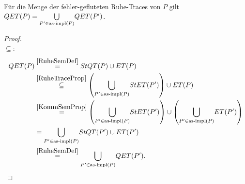 \begin{Prop}
  \label{RuheSemProp}
  Für die Menge der fehler-gefluteten Ruhe-Traces von $P$ gilt $QET (P) =
  \underset{P'\in\mathrm{as}\text{-}\mathrm{impl} (P)}{\bigcup} QET (P')$.
\end{Prop}
\begin{proof}\mbox{}\\
  $\subseteq$:
  \begin{align*}
    QET (P)&\overset{\ref{RuheSemDef}}{=} StQT (P) \cup ET (P)\\
    &\overset{\ref{RuheTraceProp}}{\subseteq} \left(\underset{P'\in\mathrm{as}\text{-}\mathrm{impl}
    (P)}{\bigcup} StET (P')\right)\cup ET (P)\\
    &\overset{\ref{KommSemProp}}{=} \left(\underset{P'\in\mathrm{as}\text{-}\mathrm{impl}
    (P)}{\bigcup} StET (P')\right)\cup \left(\underset{P'\in\mathrm{as}\text{-}\mathrm{impl}
    (P)}{\bigcup} ET (P')\right)\\
    &= \underset{P'\in\mathrm{as}\text{-}\mathrm{impl} (P)}{\bigcup} StQT (P') \cup ET (P')\\
    &\overset{\ref{RuheSemDef}}{=} \underset{P'\in\mathrm{as}\text{-}\mathrm{impl} (P)}{\bigcup} QET
    (P').\\
  \end{align*}


\end{proof}
